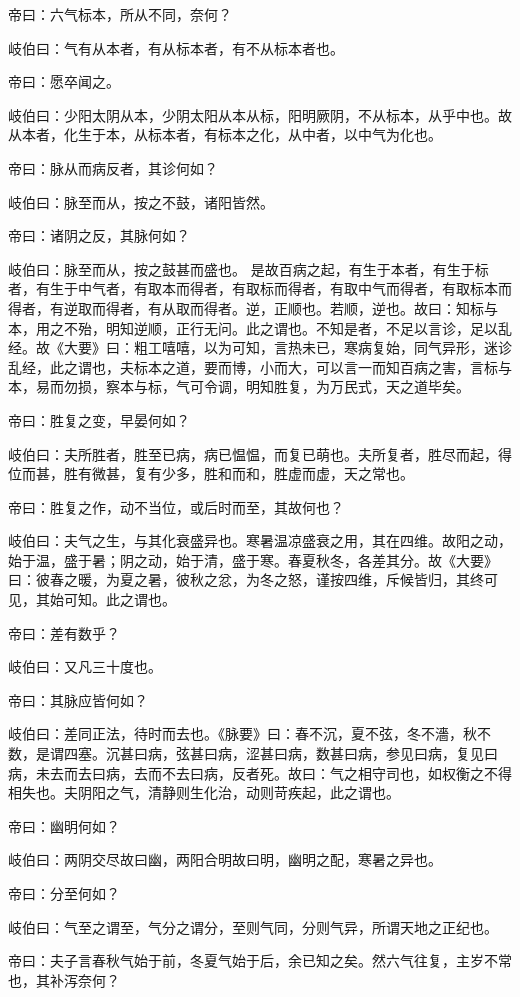 \documentclass{article}%
\begin{document}
帝曰：六气标本，所从不同，奈何？

岐伯曰：气有从本者，有从标本者，有不从标本者也。

帝曰：愿卒闻之。

岐伯曰：少阳太阴从本，少阴太阳从本从标，阳明厥阴，不从标本，从乎中也。故从本者，化生于本，从标本者，有标本之化，从中者，以中气为化也。

帝曰：脉从而病反者，其诊何如？

岐伯曰：脉至而从，按之不鼓，诸阳皆然。

帝曰：诸阴之反，其脉何如？

岐伯曰：脉至而从，按之鼓甚而盛也。 是故百病之起，有生于本者，有生于标者，有生于中气者，有取本而得者，有取标而得者，有取中气而得者，有取标本而得者，有逆取而得者，有从取而得者。逆，正顺也。若顺，逆也。故曰：知标与本，用之不殆，明知逆顺，正行无问。此之谓也。不知是者，不足以言诊，足以乱经。故《大要》曰：粗工嘻嘻，以为可知，言热未已，寒病复始，同气异形，迷诊乱经，此之谓也，夫标本之道，要而博，小而大，可以言一而知百病之害，言标与本，易而勿损，察本与标，气可令调，明知胜复，为万民式，天之道毕矣。

帝曰：胜复之变，早晏何如？

岐伯曰：夫所胜者，胜至已病，病已愠愠，而复已萌也。夫所复者，胜尽而起，得位而甚，胜有微甚，复有少多，胜和而和，胜虚而虚，天之常也。

帝曰：胜复之作，动不当位，或后时而至，其故何也？

岐伯曰：夫气之生，与其化衰盛异也。寒暑温凉盛衰之用，其在四维。故阳之动，始于温，盛于暑；阴之动，始于清，盛于寒。春夏秋冬，各差其分。故《大要》曰：彼春之暖，为夏之暑，彼秋之忿，为冬之怒，谨按四维，斥候皆归，其终可见，其始可知。此之谓也。

帝曰：差有数乎？

岐伯曰：又凡三十度也。

帝曰：其脉应皆何如？

岐伯曰：差同正法，待时而去也。《脉要》曰：春不沉，夏不弦，冬不濇，秋不数，是谓四塞。沉甚曰病，弦甚曰病，涩甚曰病，数甚曰病，参见曰病，复见曰病，未去而去曰病，去而不去曰病，反者死。故曰：气之相守司也，如权衡之不得相失也。夫阴阳之气，清静则生化治，动则苛疾起，此之谓也。

帝曰：幽明何如？

岐伯曰：两阴交尽故曰幽，两阳合明故曰明，幽明之配，寒暑之异也。

帝曰：分至何如？

岐伯曰：气至之谓至，气分之谓分，至则气同，分则气异，所谓天地之正纪也。

帝曰：夫子言春秋气始于前，冬夏气始于后，余已知之矣。然六气往复，主岁不常也，其补泻奈何？
\end{document}
